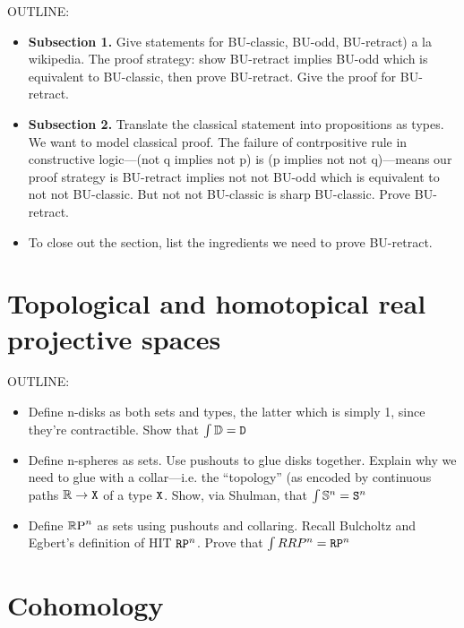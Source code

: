 \documentclass{amsart}
\begin{document}
OUTLINE:
\begin{itemize}
\item
  \textbf{Subsection 1.} Give statements for BU-classic,
  BU-odd, BU-retract) a la wikipedia. The proof strategy:
  show BU-retract implies BU-odd which is equivalent to
  BU-classic, then prove BU-retract. Give the proof for
  BU-retract.
\item
  \textbf{Subsection 2.} Translate the classical statement
  into propositions as types. We want to model classical proof.
  The failure of contrpositive rule in constructive
  logic---(not q implies not p) is (p implies not not
  q)---means our proof strategy is BU-retract implies not
  not BU-odd which is equivalent to not not BU-classic. But
  not not BU-classic is sharp BU-classic. Prove BU-retract. 
\item
  To close out the section, list the ingredients we need to
  prove BU-retract.
\end{itemize}


\section{Topological and homotopical real projective spaces}
\label{sec:rpn}

OUTLINE:
\begin{itemize}
\item
  Define n-disks as both sets and types, the latter which is
  simply 1, since they're contractible. Show that $ \int
  \mathbb{D} = \mathtt{D} $
\item
  Define n-spheres as sets.  Use pushouts to glue
  disks together. Explain why we need to glue with a
  collar---i.e. the ``topology'' (as encoded by continuous
  paths $ \mathbb{R} \to \mathtt{X} $ of a type $ \mathtt{X} $. Show, via Shulman,
  that $ \int \mathbb{S}^n = \mathtt{S}^n $
\item
  Define $ \mathbb{R}\textrm{P}^n $ as sets using pushouts and collaring.
  Recall Bulcholtz and Egbert's definition of HIT $ \mathtt{RP}^n
  $. Prove that $ \int RRP^n = \mathtt{RP}^n $
\end{itemize}


\section{Cohomology}
\label{sec:cohom}
\end{document}

